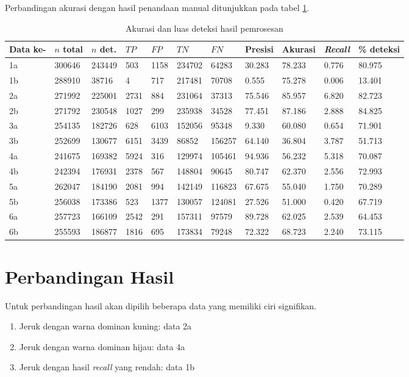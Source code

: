 \documentclass[laporan.tex]{subfiles}
\begin{document}
Perbandingan akurasi dengan hasil penandaan manual ditunjukkan pada tabel \ref{table:detconfuse}.

\begin{table}[h!]
\tiny
\centering
\begin{tabular} {|l|l|l|l|l|l|l|l|l|l|l|}
\hline
Data ke- & $n$ total & $n$ det.&  $TP$ & $FP$ & $TN$ & $FN$ & Presisi & Akurasi & \emph{Recall} & \% deteksi \\
\hline
1a & 300646&243449&503&1158&234702&64283&30.283&78.233&0.776&80.975 \\
1b & 288910&38716&4&717&217481&70708&0.555&75.278&0.006&13.401 \\
2a & 271992&225001&2731&884&231064&37313&75.546&85.957&6.820&82.723 \\
2b & 271792&230548&1027&299&235938&34528&77.451&87.186&2.888&84.825 \\
3a & 254135&182726&628&6103&152056&95348&9.330&60.080&0.654&71.901 \\
3b & 252699&130677&6151&3439&86852&156257&64.140&36.804&3.787&51.713 \\
4a & 241675&169382&5924&316&129974&105461&94.936&56.232&5.318&70.087 \\
4b & 242394&176931&2378&567&148804&90645&80.747&62.370&2.556&72.993 \\
5a & 262047&184190&2081&994&142149&116823&67.675&55.040&1.750&70.289 \\
5b & 256038&173386&523&1377&130057&124081&27.526&51.000&0.420&67.719 \\
6a & 257723&166109&2542&291&157311&97579&89.728&62.025&2.539&64.453 \\
6b & 255593&186877&1816&695&173834&79248&72.322&68.723&2.240&73.115 \\
\hline
\end{tabular}
\normalsize
\caption{Akurasi dan luas deteksi hasil pemrosesan}
\label{table:detconfuse}
\end{table}

\section{Perbandingan Hasil}

Untuk perbandingan hasil akan dipilih beberapa data yang memiliki ciri signifikan.

\begin{enumerate}
\item Jeruk dengan warna dominan kuning: data 2a
\item Jeruk dengan warna dominan hijau: data 4a
\item Jeruk dengan hasil \emph{recall} yang rendah: data 1b
\end{enumerate}
\end{document}
